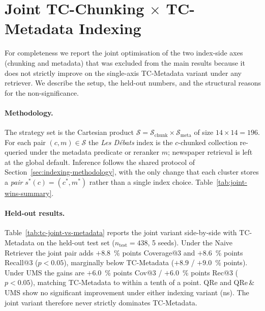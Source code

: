 
\section{Joint TC-Chunking $\times$ TC-Metadata Indexing}
\label{sec:appendix-joint}

For completeness we report the joint optimisation of the two index-side
axes (chunking and metadata) that was excluded from the main results
because it does not strictly improve on the single-axis TC-Metadata
variant under any retriever. We describe the setup, the held-out
numbers, and the structural reasons for the non-significance.

\paragraph{Methodology.} The strategy set is the Cartesian product
$\mathcal{S} = \mathcal{S}_{\text{chunk}} \times \mathcal{S}_{\text{meta}}$
of size $14 \times 14 = 196$. For each pair $(c, m) \in \mathcal{S}$ the
\textit{Les Débats} index is the $c$-chunked collection re-queried
under the metadata predicate or reranker $m$; newspaper retrieval is
left at the global default. Inference follows the shared protocol of
Section~\ref{sec:indexing-methodology}, with the only change that each
cluster stores a \emph{pair} $s^{*}(c) = (c^{*}, m^{*})$ rather than a
single index choice.
Table~\ref{tab:joint-wins-summary}.

\paragraph{Held-out results.}
Table~\ref{tab:tc-joint-vs-metadata} reports the joint variant
side-by-side with TC-Metadata on the held-out test set
($n_{\text{test}}{=}438$, 5 seeds). Under the Naive Retriever the joint
pair adds $+8.8$~\% points Coverage@3 and $+8.6$~\% points Recall@3
($p<0.05$), marginally below TC-Metadata ($+8.9$ / $+9.0$~\% points).
Under UMS the gains are $+6.0$~\% points Cov@3 / $+6.0$~\% points Rec@3
($p<0.05$), matching TC-Metadata to within a tenth of a point. QRe and
QRe\,\&\,UMS show no significant improvement under either indexing
variant (ns). The joint variant therefore never strictly dominates
TC-Metadata.

